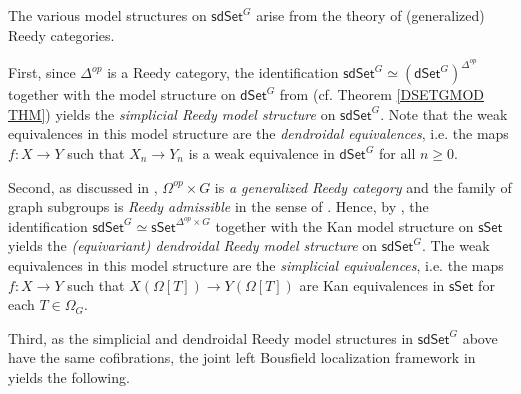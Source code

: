 \documentclass[a4paper,10pt
,draft
]{article}%
\numberwithin{equation}{section}
\numberwithin{figure}{section}
\theoremstyle{definition} %
\newcommand{\dSet}{\mathsf{dSet}}
\newcommand{\1}{\ensuremath{\mathbbm 1}}%
\begin{document}
The various model structures on $\mathsf{sdSet}^G$ arise
from the theory of (generalized) Reedy categories.


First, since $\Delta^{op}$ is a Reedy category,
the identification
$\mathsf{sdSet}^G \simeq 
\left(\mathsf{dSet}^G\right)^{\Delta^{op}}$
together with the model structure on 
$\mathsf{dSet}^G$ from \cite{Per18}
(cf. Theorem \ref{DSETGMOD THM})
yields the 
\textit{simplicial Reedy model structure} on $\mathsf{sdSet}^G$.
Note that the weak equivalences in this model structure
are the \textit{dendroidal equivalences},
i.e. the maps
$f \colon X \to Y$
such that $X_n \to Y_n$ is a weak equivalence in $\dSet^G$ for all $n \geq 0$.

Second, as discussed in 
\cite[Ex. A.7]{BP_edss},
$\Omega^{op} \times G$ is \emph{a generalized Reedy category}
and the family of {\color{blue} graph subgroups} is
\emph{Reedy admissible}
in the sense of \cite[Ex. A.2]{BP_edss}.
Hence, by \cite[Thm. A.8]{BP_edss},
the identification 
$\mathsf{sdSet}^G \simeq 
\mathsf{sSet}^{\Delta^{op} \times G}$
together with the Kan model structure on 
$\mathsf{sSet}$
yields the 
\textit{(equivariant) dendroidal Reedy model structure} on $\mathsf{sdSet}^G$.
The weak equivalences in this model structure are the
\emph{simplicial equivalences},
i.e. the maps $f \colon X \to Y$
such that 
$X(\Omega[T]) \to Y(\Omega[T])$
are Kan equivalences in $\mathsf{sSet}$
for each $T \in \Omega_G$.

Third, as the simplicial and dendroidal Reedy model structures
in $\mathsf{sdSet}^G$ above have the same cofibrations,
the joint left Bousfield localization framework in 
\cite[\S 4.1]{BP_edss}
yields the following.
\end{document}
